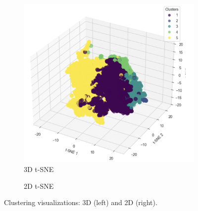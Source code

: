 \begin{figure}[H]
    \centering
    \begin{subfigure}[b]{0.45\textwidth}
        \centering
        \includegraphics[width=\textwidth]{src/figs/3d_t-SNE.png}
        \caption{3D t-SNE}
        \label{fig:3D_tsne}
    \end{subfigure}
    \hfill
    \begin{subfigure}[b]{0.45\textwidth}
        \centering
        \caption{2D t-SNE}
        \label{fig:2D_tsne}
    \end{subfigure}
    \caption{Clustering visualizations: 3D (left) and 2D (right).}
    \label{fig:comparison2}
\end{figure}

